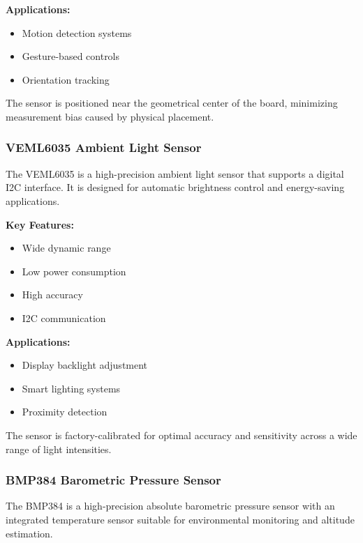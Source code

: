 \documentclass[
  9pt,
  letterpaper,
  abstract,
  titlepage]{scrbook}
\begin{document}
\textbf{Applications:}

\begin{itemize}
\item
  Motion detection systems
\item
  Gesture-based controls
\item
  Orientation tracking
\end{itemize}

The sensor is positioned near the geometrical center of the board,
minimizing measurement bias caused by physical placement.

\subsubsection{VEML6035 Ambient Light
Sensor}\label{veml6035-ambient-light-sensor}

The VEML6035 is a high-precision ambient light sensor that supports a
digital I2C interface. It is designed for automatic brightness control
and energy-saving applications.

\textbf{Key Features:}

\begin{itemize}
\item
  Wide dynamic range
\item
  Low power consumption
\item
  High accuracy
\item
  I2C communication
\end{itemize}

\textbf{Applications:}

\begin{itemize}
\item
  Display backlight adjustment
\item
  Smart lighting systems
\item
  Proximity detection
\end{itemize}

The sensor is factory-calibrated for optimal accuracy and sensitivity
across a wide range of light intensities.

\subsubsection{BMP384 Barometric Pressure
Sensor}\label{bmp384-barometric-pressure-sensor}

The BMP384 is a high-precision absolute barometric pressure sensor with
an integrated temperature sensor suitable for environmental monitoring
and altitude estimation.
\end{document}
